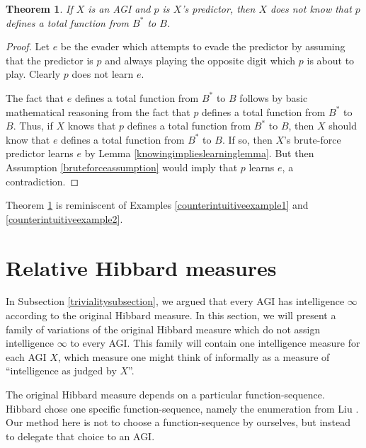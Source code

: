 \documentclass{article}
\newtheorem{theorem}{Theorem}
\begin{document}
\begin{theorem}
\label{counterintuitivetheorem}
    If $X$ is an AGI and $p$ is $X$'s predictor, then $X$ does not know that
    $p$ defines a total function from $B^*$ to $B$.
\end{theorem}

\begin{proof}
    Let $e$ be the evader which attempts to evade the predictor by assuming that
    the predictor is $p$ and always playing the opposite digit which $p$ is
    about to play. Clearly $p$ does not learn $e$.

    The fact that $e$ defines a total function from $B^*$ to $B$ follows
    by basic mathematical reasoning from the fact that $p$ defines a total
    function from $B^*$ to $B$. Thus, if $X$ knows that $p$ defines a total
    function from $B^*$ to $B$, then $X$ should know that $e$ defines a total
    function from $B^*$ to $B$. If so, then $X$'s brute-force predictor learns
    $e$ by Lemma \ref{knowingimplieslearninglemma}. But then
    Assumption \ref{bruteforceassumption} would imply that $p$ learns $e$,
    a contradiction.
\end{proof}

Theorem \ref{counterintuitivetheorem} is reminiscent of
Examples \ref{counterintuitiveexample1} and \ref{counterintuitiveexample2}.


\section{Relative Hibbard measures}
\label{simplemeasuresection}

In Subsection \ref{trivialitysubsection}, we argued that every AGI has
intelligence $\infty$ according to the original Hibbard measure.
In this section, we will present a family of variations of the original Hibbard measure
which do not assign intelligence $\infty$ to every AGI.
This family will contain
one intelligence measure for each AGI $X$, which measure one might think of informally as
a measure of ``intelligence as judged by $X$''.

The original Hibbard measure depends on a particular function-sequence. Hibbard chose
one specific function-sequence, namely the enumeration from Liu \cite{liu1960enumeration}.
Our method here is not to choose a function-sequence by ourselves, but instead to
delegate that choice to an AGI.
\end{document}
